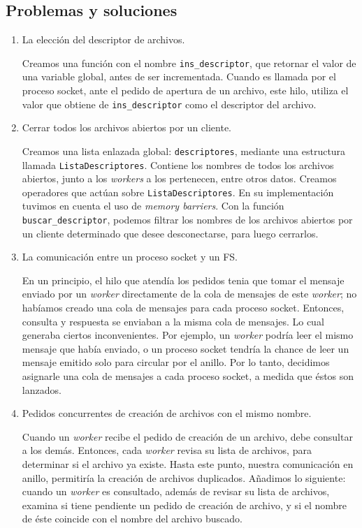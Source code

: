 \documentclass[a4paper, 8pt]{article}
\begin{document}
\subsection{Problemas y soluciones}
  \begin{enumerate}
    \item La elección del descriptor de archivos.
    
    Creamos una función con el nombre \texttt{ins\_descriptor}, que retornar el valor de una variable global, antes de ser incrementada.
    Cuando es llamada por el proceso socket, ante el pedido de apertura de un archivo, este hilo, utiliza el valor que obtiene de \texttt{ins\_descriptor} como el
    descriptor del archivo.
    
    \item Cerrar todos los archivos abiertos por un cliente.
    
    Creamos una lista enlazada global: \texttt{descriptores}, mediante una estructura llamada \texttt{ListaDescriptores}. Contiene los nombres de todos los archivos abiertos, junto a los \textit{workers} a los pertenecen, entre otros datos.
    Creamos operadores que actúan sobre \texttt{ListaDescriptores}.
    En su implementación tuvimos en cuenta el uso de \textit{memory barriers}.
    Con la función \texttt{buscar\_descriptor}, podemos filtrar los nombres de los archivos abiertos por un cliente determinado que desee desconectarse, para luego cerrarlos.
    
    \item La comunicación entre un proceso socket y un FS.
    
    En un principio, el hilo que atendía los pedidos tenia que tomar el mensaje enviado por un \textit{worker} directamente de la cola de mensajes de este \textit{worker};
    no habíamos creado una cola de mensajes para cada proceso socket. 
    Entonces, consulta y respuesta se enviaban a la misma cola de mensajes. Lo cual generaba ciertos inconvenientes. Por ejemplo,
    un \textit{worker} podría leer el mismo mensaje que había enviado, o un proceso socket tendría la chance de
    leer un mensaje emitido solo para circular por el anillo.
    Por lo tanto, decidimos asignarle una cola de mensajes a cada proceso socket, a medida que éstos son lanzados.
    
    \item Pedidos concurrentes de creación de archivos con el mismo nombre.
    
    Cuando un \textit{worker} recibe el pedido de creación de un archivo, debe consultar a los demás. Entonces, cada \textit{worker} revisa su lista de archivos, para
    determinar si el archivo ya existe. Hasta este punto, nuestra comunicación en anillo, permitiría la creación de archivos duplicados.
    Añadimos lo siguiente:
    cuando un \textit{worker} es consultado, además de revisar su lista de archivos, examina si tiene pendiente un pedido de creación de archivo,
    y si el nombre de éste coincide con el nombre del archivo buscado.
    

\end{enumerate}
\end{document}
